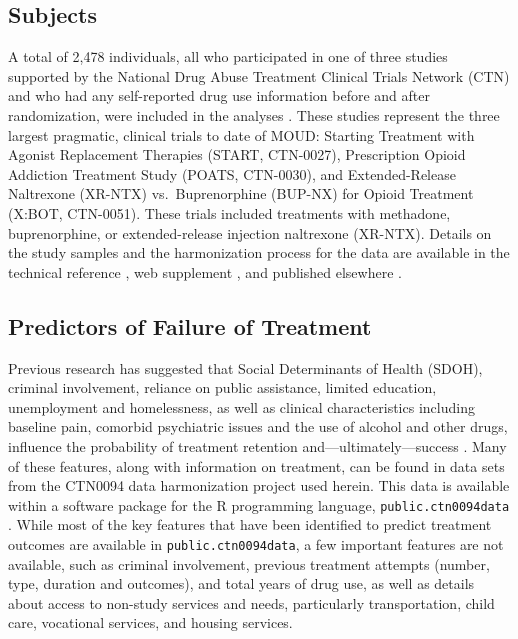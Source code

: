 \documentclass[
  number,
  preprint,
  3p,
  onecolumn]{elsarticle}
\begin{document}
\subsection{Subjects}\label{subjects}

A total of 2,478 individuals, all who participated in one of three
studies supported by the National Drug Abuse Treatment Clinical Trials
Network (CTN) and who had any self-reported drug use information before
and after randomization, were included in the analyses
\citep{saxon2013, weiss2011, lee2018, R-public.ctn0094data}. These
studies represent the three largest pragmatic, clinical trials to date
of MOUD: Starting Treatment with Agonist Replacement Therapies (START,
CTN-0027), Prescription Opioid Addiction Treatment Study (POATS,
CTN-0030), and Extended-Release Naltrexone (XR-NTX) vs.~Buprenorphine
(BUP-NX) for Opioid Treatment (X:BOT, CTN-0051). These trials included
treatments with methadone, buprenorphine, or extended-release injection
naltrexone (XR-NTX). Details on the study samples and the harmonization
process for the data are available in the technical reference
\citep{balise_technical_2025}, web supplement
\citep{balise_supplement_2025}, and published elsewhere
\citep{raymondbalise2024}.

\subsection{Predictors of Failure of
Treatment}\label{predictors-of-failure-of-treatment}

Previous research has suggested that Social Determinants of Health
(SDOH), criminal involvement, reliance on public assistance, limited
education, unemployment and homelessness, as well as clinical
characteristics including baseline pain, comorbid psychiatric issues and
the use of alcohol and other drugs, influence the probability of
treatment retention and---ultimately---success
\citep{hser1997, biondi2022, pretreat1981, comptoniii2003, mclellan1983}.
Many of these features, along with information on treatment, can be
found in data sets from the CTN0094 data harmonization project used
herein. This data is available within a software package for the R
programming language, \texttt{public.ctn0094data}
\citep{public.ctn0094data}. While most of the key features that have
been identified to predict treatment outcomes are available in
\texttt{public.ctn0094data}, a few important features are not available,
such as criminal involvement, previous treatment attempts (number, type,
duration and outcomes), and total years of drug use, as well as details
about access to non-study services and needs, particularly
transportation, child care, vocational services, and housing services.
\end{document}
